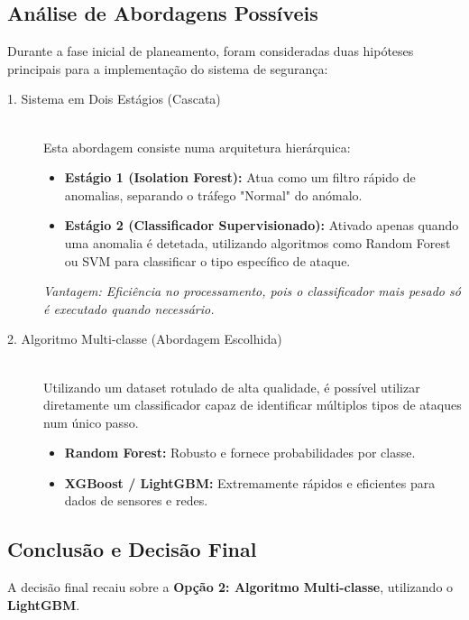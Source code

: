 \documentclass[12pt,a4paper]{article}
\begin{document}
\subsection{Análise de Abordagens Possíveis}
Durante a fase inicial de planeamento, foram consideradas duas hipóteses principais para a implementação do sistema de segurança:

\begin{description}
    \item[\textcolor{ubiBlue}{1. Sistema em Dois Estágios (Cascata)}] \hfill \\
    Esta abordagem consiste numa arquitetura hierárquica:
    \begin{itemize}
        \item \textbf{Estágio 1 (Isolation Forest):} Atua como um filtro rápido de anomalias, separando o tráfego "Normal" do anómalo.
        \item \textbf{Estágio 2 (Classificador Supervisionado):} Ativado apenas quando uma anomalia é detetada, utilizando algoritmos como Random Forest ou SVM para classificar o tipo específico de ataque.
    \end{itemize}
    \textit{Vantagem: Eficiência no processamento, pois o classificador mais pesado só é executado quando necessário.}

    \vspace{0.5cm}

    \item[\textcolor{ubiBlue}{2. Algoritmo Multi-classe (Abordagem Escolhida)}] \hfill \\
    Utilizando um dataset rotulado de alta qualidade, é possível utilizar diretamente um classificador capaz de identificar múltiplos tipos de ataques num único passo.
    \begin{itemize}
        \item \textbf{Random Forest:} Robusto e fornece probabilidades por classe.
        \item \textbf{XGBoost / LightGBM:} Extremamente rápidos e eficientes para dados de sensores e redes.
    \end{itemize}
\end{description}

\subsection{Conclusão e Decisão Final}
A decisão final recaiu sobre a \textbf{Opção 2: Algoritmo Multi-classe}, utilizando o \textbf{LightGBM}.
\end{document}
